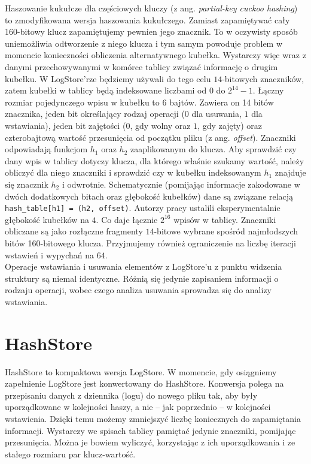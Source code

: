 \documentclass[declaration,shortabstract,masc]{iithesis}
\begin{document}
			\indent Haszowanie kukułcze dla częściowych kluczy (z ang. \textit{partial-key cuckoo hashing}) \cite{PKCH} to zmodyfikowana wersja haszowania kukułczego. Zamiast zapamiętywać cały 160-bitowy klucz zapamiętujemy pewnien jego znacznik. To w oczywisty sposób uniemożliwia odtworzenie z niego klucza i tym samym powoduje problem w momencie konieczności obliczenia alternatywnego kubełka. Wystarczy więc wraz z danymi przechowywanymi w komórce tablicy związać informację o drugim kubełku. W LogStore'rze będziemy używali do tego celu $14$-bitowych znaczników, zatem kubełki w tablicy będą indeksowane liczbami od $0$ do $2^{14} - 1$. Łączny rozmiar pojedynczego wpisu w kubełku to 6 bajtów. Zawiera on 14 bitów znacznika, jeden bit określający rodzaj operacji ($0$ dla usuwania, $1$ dla wstawiania), jeden bit zajętości ($0$, gdy wolny oraz $1$, gdy zajęty) oraz czterobajtową wartość przesunięcia od początku pliku (z ang. \textit{offset}). Znaczniki odpowiadają funkcjom $h_1$ oraz $h_2$ zaaplikowanym do klucza. Aby sprawdzić czy dany wpis w tablicy dotyczy klucza, dla którego właśnie szukamy wartość, należy obliczyć dla niego znaczniki i sprawdzić czy w kubełku indeksowanym $h_1$ znajduje się znacznik $h_2$ i odwrotnie. Schematycznie (pomijając informacje zakodowane w dwóch dodatkowych bitach oraz głębokość kubełków) dane są związane relacją \texttt{hash\_table[h1] = (h2, offset)}. Autorzy pracy \cite{SILT} ustalili eksperymentalnie głębokość kubełków na $4$. Co daje łącznie $2^{16}$ wpisów w tablicy. Znaczniki obliczane są jako rozłączne fragmenty $14$-bitowe wybrane spośród najmłodszych bitów 160-bitowego klucza. Przyjmujemy również ograniczenie na liczbę iteracji wstawień i wypychań na $64$.\\
			\indent Operacje wstawiania i usuwania elementów z LogStore'u z punktu widzenia struktury są niemal identyczne. Różnią się jedynie zapisaniem informacji o rodzaju operacji, wobec czego analiza usuwania sprowadza się do analizy wstawiania.
		\section{HashStore}
			HashStore to kompaktowa wersja LogStore. W momencie, gdy osiągniemy zapełnienie LogStore jest konwertowany do HashStore. Konwersja polega na przepisaniu danych z dziennika (logu) do nowego pliku tak, aby były uporządkowane w kolejności haszy, a nie -- jak poprzednio -- w kolejności wstawienia. Dzięki temu możemy zmniejszyć liczbę koniecznych do zapamiętania informacji. Wystarczy we spisach tablicy pamiętać jedynie znaczniki, pomijając przesunięcia. Można je bowiem wyliczyć, korzystając z ich uporządkowania i ze stałego rozmiaru par klucz-wartość.
\end{document}
